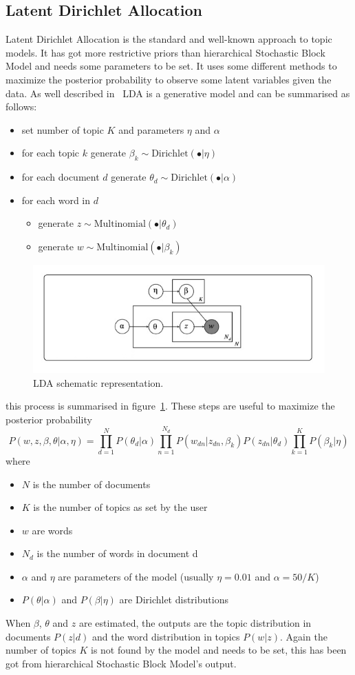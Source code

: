 \subsection{Latent Dirichlet Allocation}\label{sec:lda}
Latent Dirichlet Allocation is the standard and well-known approach to topic models. It has got more restrictive priors than hierarchical Stochastic Block Model and needs some parameters to be set. It uses some different methods to maximize the posterior probability to observe some latent variables given the data.
As well described in~\cite{Zhou2016} LDA is a generative model and can be summarised as follows:
\begin{itemize}
	\item set number of topic $K$ and parameters $\eta$ and $\alpha$
	\item for each topic $k$ generate $\beta_k\sim \text{Dirichlet}(\bullet |\eta)$
	\item for each document $d$ generate $\theta_d\sim \text{Dirichlet}(\bullet|\alpha)$
	\item for each word in $d$ 
	\begin{itemize}
		\item generate $z\sim \text{Multinomial}(\bullet|\theta_d)$
		\item generate $w\sim \text{Multinomial}(\bullet|\beta_k)$
	\end{itemize}
\end{itemize}
\begin{figure}[htb!]
	\centering
	\includegraphics[width=0.65\linewidth]{pictures/topic/LDA.jpeg}
	\caption{LDA schematic representation.}
	\label{fig:LDA}
\end{figure}
this process is summarised in figure~\ref{fig:LDA}. These steps are useful to maximize the posterior probability
\begin{equation}\label{eq:lda}
P(w, z,\beta, \theta| \alpha, \eta)=\prod_{d=1}^N P(\theta_d | \alpha)\prod_{n=1}^{N_d} P(w_{dn}|z_{dn},\beta_k)P(z_{dn}|\theta_d)\prod_{k=1}^KP(\beta_k|\eta)
\end{equation}
where
\begin{itemize}
	\item $N$ is the number of documents
	\item $K$ is the number of topics as set by the user
	\item $w$ are words
	\item $N_d$ is the number of words in document d
	\item $\alpha$ and $\eta$ are parameters of the model (usually $\eta=0.01$ and $\alpha=50/K$)
	\item $P(\theta | \alpha)$ and $P(\beta|\eta)$ are Dirichlet distributions
\end{itemize}
When $\beta$, $\theta$ and $z$ are estimated, the outputs are the topic distribution in documents $P(z|d)$ and the word distribution in topics $P(w|z)$.
Again the number of topics $K$ is not found by the model and needs to be set, this has been got from hierarchical Stochastic Block Model's output.